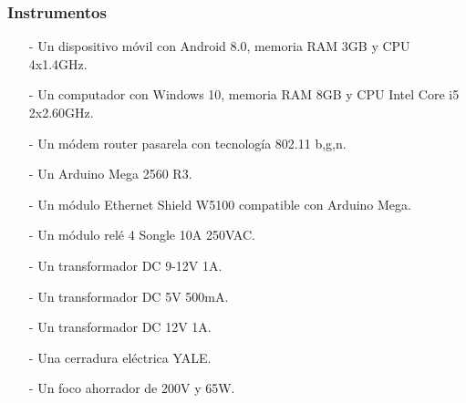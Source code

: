 \subsubsection{Instrumentos}
\begin{enumerate}
\item[-]Un dispositivo móvil con Android 8.0, memoria RAM 3GB y CPU 4x1.4GHz.
\item[-]Un computador con Windows 10, memoria RAM 8GB y CPU Intel Core i5 2x2.60GHz.
\item[-]Un módem router pasarela con tecnología 802.11 b,g,n.
\item[-]Un Arduino Mega 2560 R3.
\item[-]Un módulo Ethernet Shield W5100 compatible con Arduino Mega.
\item[-]Un módulo relé 4 Songle 10A 250VAC.
\item[-]Un transformador DC 9-12V 1A.
\item[-]Un transformador DC 5V 500mA.
\item[-]Un transformador DC 12V 1A.
\item[-]Una cerradura eléctrica YALE.
\item[-]Un foco ahorrador de 200V y 65W.
\end{enumerate}

